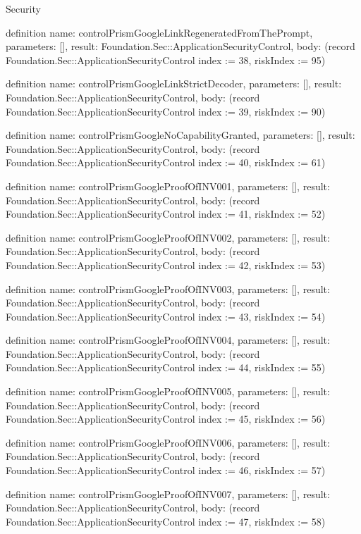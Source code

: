 \begin{lexlean}{Security}
\begin{semanticmodule}
definition{
  name: controlPrismGoogleLinkRegeneratedFromThePrompt,
  parameters: [],
  result: Foundation.Sec::ApplicationSecurityControl,
  body: (record Foundation.Sec::ApplicationSecurityControl {index := 38, riskIndex := 95})
}

definition{
  name: controlPrismGoogleLinkStrictDecoder,
  parameters: [],
  result: Foundation.Sec::ApplicationSecurityControl,
  body: (record Foundation.Sec::ApplicationSecurityControl {index := 39, riskIndex := 90})
}

definition{
  name: controlPrismGoogleNoCapabilityGranted,
  parameters: [],
  result: Foundation.Sec::ApplicationSecurityControl,
  body: (record Foundation.Sec::ApplicationSecurityControl {index := 40, riskIndex := 61})
}

definition{
  name: controlPrismGoogleProofOfINV001,
  parameters: [],
  result: Foundation.Sec::ApplicationSecurityControl,
  body: (record Foundation.Sec::ApplicationSecurityControl {index := 41, riskIndex := 52})
}

definition{
  name: controlPrismGoogleProofOfINV002,
  parameters: [],
  result: Foundation.Sec::ApplicationSecurityControl,
  body: (record Foundation.Sec::ApplicationSecurityControl {index := 42, riskIndex := 53})
}

definition{
  name: controlPrismGoogleProofOfINV003,
  parameters: [],
  result: Foundation.Sec::ApplicationSecurityControl,
  body: (record Foundation.Sec::ApplicationSecurityControl {index := 43, riskIndex := 54})
}

definition{
  name: controlPrismGoogleProofOfINV004,
  parameters: [],
  result: Foundation.Sec::ApplicationSecurityControl,
  body: (record Foundation.Sec::ApplicationSecurityControl {index := 44, riskIndex := 55})
}

definition{
  name: controlPrismGoogleProofOfINV005,
  parameters: [],
  result: Foundation.Sec::ApplicationSecurityControl,
  body: (record Foundation.Sec::ApplicationSecurityControl {index := 45, riskIndex := 56})
}

definition{
  name: controlPrismGoogleProofOfINV006,
  parameters: [],
  result: Foundation.Sec::ApplicationSecurityControl,
  body: (record Foundation.Sec::ApplicationSecurityControl {index := 46, riskIndex := 57})
}

definition{
  name: controlPrismGoogleProofOfINV007,
  parameters: [],
  result: Foundation.Sec::ApplicationSecurityControl,
  body: (record Foundation.Sec::ApplicationSecurityControl {index := 47, riskIndex := 58})
}


\end{semanticmodule}
\end{lexlean}
